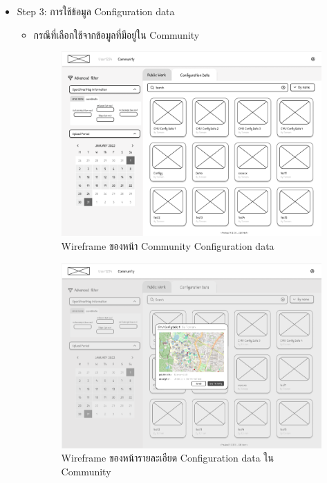 \begin{mypara}
\begin{itemize}
    \item Step 3: การใช้ข้อมูล Configuration data
    \begin{itemize}
        \item กรณีที่เลือกใช้จากข้อมูลที่มีอยู่ใน Community
          \begin{figure}[H]
            \centering
            \includegraphics[scale=0.4]{conf_commu.png}
            \caption{Wireframe ของหน้า Community Configuration data}
            \label{fig:WireframeCommunityConfigLogin}
          \end{figure}

          \begin{figure}[H]
            \centering
            \includegraphics[scale=0.4]{conf_commu_detail_reg.png}
            \caption{Wireframe ของหน้ารายละเอียด Configuration data ใน Community}
            \label{fig:WireframeCommunityConfigDetailLogin}
          \end{figure}


\end{itemize}
\end{itemize}
\end{mypara}
